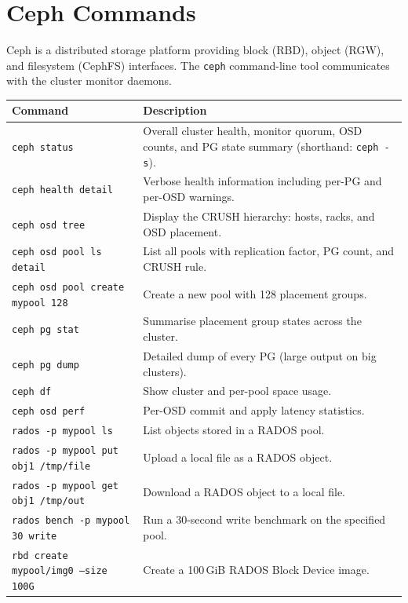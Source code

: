 \section*{Ceph Commands}

Ceph is a distributed storage platform providing block (RBD), object (RGW),
and filesystem (CephFS) interfaces. The \texttt{ceph} command-line tool
communicates with the cluster monitor daemons.

\begin{longtable}{p{4cm} p{8cm}}
\toprule
\textbf{Command} & \textbf{Description} \\
\midrule
\endhead
\texttt{ceph status} & Overall cluster health, monitor quorum, OSD counts, and PG state summary (shorthand: \texttt{ceph -s}). \\
\texttt{ceph health detail} & Verbose health information including per-PG and per-OSD warnings. \\
\texttt{ceph osd tree} & Display the CRUSH hierarchy: hosts, racks, and OSD placement. \\
\texttt{ceph osd pool ls detail} & List all pools with replication factor, PG count, and CRUSH rule. \\
\texttt{ceph osd pool create mypool 128} & Create a new pool with 128 placement groups. \\
\texttt{ceph pg stat} & Summarise placement group states across the cluster. \\
\texttt{ceph pg dump} & Detailed dump of every PG (large output on big clusters). \\
\texttt{ceph df} & Show cluster and per-pool space usage. \\
\texttt{ceph osd perf} & Per-OSD commit and apply latency statistics. \\
\midrule
\texttt{rados -p mypool ls} & List objects stored in a RADOS pool. \\
\texttt{rados -p mypool put obj1 /tmp/file} & Upload a local file as a RADOS object. \\
\texttt{rados -p mypool get obj1 /tmp/out} & Download a RADOS object to a local file. \\
\texttt{rados bench -p mypool 30 write} & Run a 30-second write benchmark on the specified pool. \\
\midrule
\texttt{rbd create mypool/img0 --size 100G} & Create a 100\,GiB RADOS Block Device image. \\

\end{longtable}
